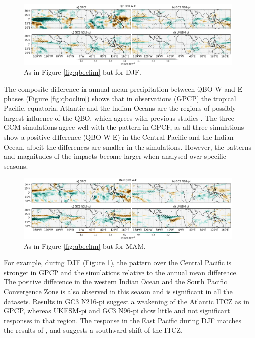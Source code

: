 \begin{figure}[t!]
\centering
 \includegraphics[width=\linewidth]{figures/piprdjfqbowqboe.png}
\caption[DJF mean precipitation composite difference QBO W-E ]{ As in Figure \ref{fig:qboclim} but for DJF. }
\label{fig:qbodjf}
\end{figure}

The composite difference in annual mean precipitation between QBO W and E phases (Figure \ref{fig:qboclim}) shows that in observations (GPCP) the tropical Pacific, equatorial Atlantic and the Indian Oceans are the regions of possibly largest influence of the QBO, which agrees with previous studies \citep{liess2012,gray2018}. The three GCM simulations agree well with the pattern in GPCP, as all three simulations show a positive difference (QBO W-E) in the Central Pacific and the Indian Ocean, albeit the differences are smaller in the simulations. However, the patterns and magnitudes of the impacts become larger when analysed over specific seasons. %

\begin{figure}[t!]
\centering
 \includegraphics[width=\linewidth]{figures/piprmamqbowqboe.png}
\caption[MAM mean precipitation composite difference QBO W-E ]{ As in Figure \ref{fig:qboclim} but for MAM. }
\label{fig:qbomam}
\end{figure}

For example, during DJF (Figure \ref{fig:qbodjf}), the pattern over the Central Pacific is stronger in GPCP and the simulations relative to the annual mean difference. The positive difference in the western Indian Ocean and the South Pacific Convergence Zone is also observed in this season and is significant in all the datasets. Results in GC3 N216-pi suggest a weakening of the Atlantic ITCZ as in GPCP, whereas UKESM-pi and GC3 N96-pi show little and not significant responses in that region.
The response in the East Pacific during DJF matches the results of \cite{serva2021}, and suggests a southward shift of the ITCZ.


